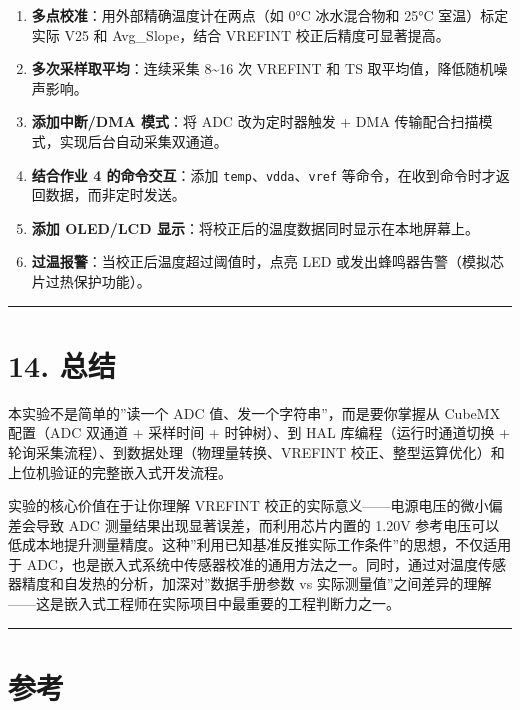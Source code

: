 \documentclass[
  chinese,
  UTF8,
  oneside,
  openany]{ctexbook}
\providecommand{\tightlist}{%
  \setlength{\itemsep}{0pt}\setlength{\parskip}{0pt}}
\begin{document}
\begin{enumerate}
\def\labelenumi{\arabic{enumi}.}
\tightlist
\item
  \textbf{多点校准}：用外部精确温度计在两点（如 0°C 冰水混合物和 25°C
  室温）标定实际 V25 和 Avg\_Slope，结合 VREFINT 校正后精度可显著提高。
\item
  \textbf{多次采样取平均}：连续采集 8\textasciitilde16 次 VREFINT 和 TS
  取平均值，降低随机噪声影响。
\item
  \textbf{添加中断/DMA 模式}：将 ADC 改为定时器触发 + DMA
  传输配合扫描模式，实现后台自动采集双通道。
\item
  \textbf{结合作业 4 的命令交互}：添加
  \texttt{temp}、\texttt{vdda}、\texttt{vref}
  等命令，在收到命令时才返回数据，而非定时发送。
\item
  \textbf{添加 OLED/LCD 显示}：将校正后的温度数据同时显示在本地屏幕上。
\item
  \textbf{过温报警}：当校正后温度超过阈值时，点亮 LED
  或发出蜂鸣器告警（模拟芯片过热保护功能）。
\end{enumerate}

\begin{center}\rule{0.5\linewidth}{0.5pt}\end{center}

\section{14. 总结}\label{ux603bux7ed3-1}

本实验不是简单的''读一个 ADC 值、发一个字符串''，而是要你掌握从 CubeMX
配置（ADC 双通道 + 采样时间 + 时钟树）、到 HAL 库编程（运行时通道切换 +
轮询采集流程）、到数据处理（物理量转换、VREFINT
校正、整型运算优化）和上位机验证的完整嵌入式开发流程。

实验的核心价值在于让你理解 VREFINT
校正的实际意义------电源电压的微小偏差会导致 ADC
测量结果出现显著误差，而利用芯片内置的 1.20V
参考电压可以低成本地提升测量精度。这种''利用已知基准反推实际工作条件''的思想，不仅适用于
ADC，也是嵌入式系统中传感器校准的通用方法之一。同时，通过对温度传感器精度和自发热的分析，加深对''数据手册参数
vs
实际测量值''之间差异的理解------这是嵌入式工程师在实际项目中最重要的工程判断力之一。

\begin{center}\rule{0.5\linewidth}{0.5pt}\end{center}

\section{参考}\label{ux53c2ux8003}
\end{document}
